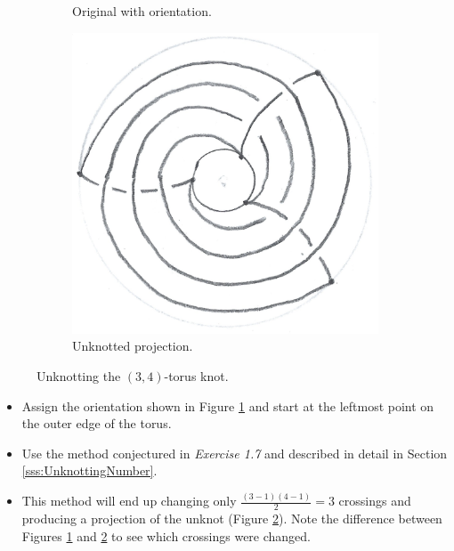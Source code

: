 \documentclass[titlepage]{article}
\numberwithin{figure}{section}
\numberwithin{table}{section}
\numberwithin{equation}{section}
\begin{document}
\begin{itemize}
\begin{figure}[h!]
\begin{subfigure}[b]{0.3\linewidth}
            \caption{Original with orientation.}
            \label{fig:ex5-7a}
        \end{subfigure}
        \hspace{2em}
        \begin{subfigure}[b]{0.3\linewidth}
            \centering
            \includegraphics[width=\linewidth]{Blender/ex5-7b.png}
            \caption{Unknotted projection.}
            \label{fig:ex5-7b}
        \end{subfigure}
        \caption{Unknotting the $(3,4)$-torus knot.}
        \label{fig:ex5-7}
    \end{figure}
    \begin{itemize}
        \item Assign the orientation shown in Figure \ref{fig:ex5-7a} and start at the leftmost point on the outer edge of the torus.
        \item Use the method conjectured in \emph{Exercise 1.7} and described in detail in Section \ref{sss:UnknottingNumber}.
        \item This method will end up changing only $\frac{(3-1)(4-1)}{2}=3$ crossings and producing a projection of the unknot (Figure \ref{fig:ex5-7b}). Note the difference between Figures \ref{fig:ex5-7a} and \ref{fig:ex5-7b} to see which crossings were changed.
    \end{itemize}

\end{itemize}
\end{document}
